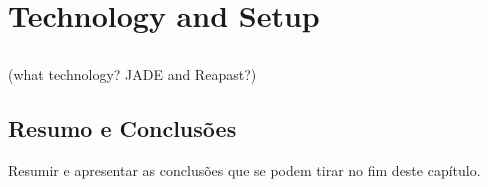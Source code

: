 \chapter{Technology and Setup}
\label{chap:technology}

\section*{}
(what technology? JADE and Reapast?)


\section{Resumo e Conclusões}

Resumir e apresentar as conclusões que se podem tirar no fim deste
capítulo.
